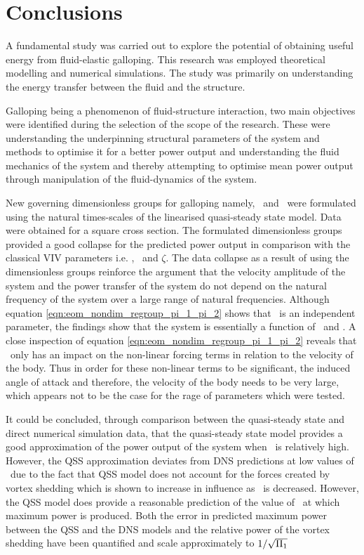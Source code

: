 \chapter{Conclusions}

A fundamental study was carried out to explore the potential of obtaining useful energy from fluid-elastic galloping. This research was employed theoretical modelling and numerical simulations. The study was primarily on understanding the energy transfer between the fluid and the structure.  

Galloping being a phenomenon of fluid-structure interaction, two main objectives were identified during the selection of the scope of the research. These were understanding the underpinning structural parameters of the system and methods to optimise it for a better power output and understanding the fluid mechanics of the system and thereby attempting to optimise mean power output through manipulation of the fluid-dynamics of the system.

New governing dimensionless groups for galloping namely, \massstiff\ and \massdamp\ were formulated using the natural times-scales of the linearised quasi-steady state model. Data were obtained for a square cross section. The formulated dimensionless groups provided a good collapse for the predicted power output in comparison with the classical VIV parameters i.e. \ustar, \mstar\ and $\zeta$. The data collapse as a result of using the dimensionless groups reinforce the argument that the velocity amplitude of the system and the power transfer of the system do not depend on the natural frequency of the system over a large range of natural frequencies. Although equation \ref{eqn:eom_nondim_regroup_pi_1_pi_2} shows that \mstar\ is an independent parameter, the findings show that the system is essentially a function of \massstiff\ and \massdamp. A close inspection of equation \ref{eqn:eom_nondim_regroup_pi_1_pi_2} reveals that \mstar\ only has an impact on the non-linear forcing terms in relation to the velocity of the body. Thus in order for these non-linear terms to be significant, the induced angle of attack and therefore, the velocity of the body needs to be very large, which appears not to be the case for the rage of parameters which were tested. 

 It could be concluded, through comparison between the quasi-steady state and direct numerical simulation data, that the quasi-steady state model provides a good approximation of the power output of the system when \massstiff\ is relatively high. However, the QSS approximation deviates from  DNS predictions at low values of \massstiff\ due to the fact that QSS model does not account for the forces created by vortex shedding which is shown to increase in influence as \massstiff\ is decreased. However, the QSS model does provide a reasonable prediction of the value of \massdamp\ at which maximum power is produced. Both the error in predicted maximum power between the QSS and the DNS models and the relative power of the vortex shedding have been quantified and scale approximately to $1/\sqrt{\Pi_1}$  
 
